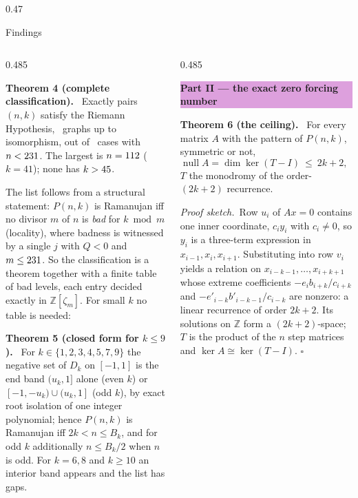 \documentclass[final]{beamer}
\newenvironment{thm}[1]{\begin{tcolorbox}[enhanced,colback=thmfill,colframe=thmfill,boxrule=0pt,arc=4pt,
   borderline west={4pt}{0pt}{plum},left=8pt,right=6pt,top=5pt,bottom=5pt,before skip=5pt,after skip=4pt]
   {\bfseries\color{ink}#1.}\ }{\end{tcolorbox}}
\newcommand{\pf}{\par{\itshape Proof sketch.}\ }
\begin{document}
\begin{frame}[t]
\begin{columns}[t,onlytextwidth]
\begin{column}{0.47\textwidth}
\begin{colwrap}
\begin{lastcard}{Findings}
\begin{columns}[t,onlytextwidth]
\begin{column}{0.485\textwidth}
\begin{thm}{Theorem 4 (complete classification)}
Exactly \textbf{\RamAllTotal} pairs $(n,k)$ satisfy the Riemann Hypothesis,
\RamAllIso\ graphs up to isomorphism, out of \RamAllCases\ cases with
$n<231$. The largest is $n=112$ ($k=41$); none has $k>45$.
\end{thm}
The list follows from a structural statement: $P(n,k)$ is Ramanujan iff no
divisor $m$ of $n$ is \emph{bad} for $k\bmod m$ (locality), where badness is
witnessed by a single $j$ with $Q<0$ and $m\le231$. So the
classification is a theorem together with a finite table of bad levels, each
entry decided exactly in $\mathbb Z[\zeta_m]$. For small $k$ no table is needed:
\begin{thm}{Theorem 5 (closed form for $k\le9$)}
For $k\in\{1,2,3,4,5,7,9\}$ the negative set of $D_k$ on $[-1,1]$ is the end band
$(u_k,1]$ alone (even $k$) or $[-1,-u_k)\cup(u_k,1]$ (odd $k$), by exact root
isolation of one integer polynomial; hence $P(n,k)$ is Ramanujan iff
$2k<n\le B_k$, and for odd $k$ additionally $n\le B_k/2$ when $n$ is odd. For
$k=6,8$ and $k\ge10$ an interior band appears and the list has gaps.
\end{thm}

\end{column}
\begin{column}{0.485\textwidth}
\colorbox{plum}{\parbox{\dimexpr\linewidth-2\fboxsep}{\centering\large\bfseries\titlefont\color{white}Part II --- the exact zero forcing number}}\vskip6pt
\begin{thm}{Theorem 6 (the ceiling)}
For every matrix $A$ with the pattern of $P(n,k)$, symmetric or not,
\[
  \operatorname{null}A=\dim\ker(T-I)\ \le\ 2k+2,\qquad\text{with equality iff }T=I,
\]
$T$ the monodromy of the order-$(2k+2)$ recurrence.
\end{thm}
\pf Row $u_i$ of $Ax=0$ contains one inner coordinate, $c_iy_i$ with $c_i\ne0$,
so $y_i$ is a three-term expression in $x_{i-1},x_i,x_{i+1}$. Substituting into
row $v_i$ yields a relation on $x_{i-k-1},\dots,x_{i+k+1}$ whose extreme
coefficients $-e_ib_{i+k}/c_{i+k}$ and $-e'_{i-k}b'_{i-k-1}/c_{i-k}$ are
nonzero: a linear recurrence of order $2k+2$. Its solutions on $\mathbb Z$ form
a $(2k+2)$-space; $T$ is the product of the $n$ step matrices and
$\ker A\cong\ker(T-I)$. \hfill$\square$


\end{column}
\end{columns}
\end{lastcard}
\end{colwrap}
\end{column}
\end{columns}
\end{frame}
\end{document}

